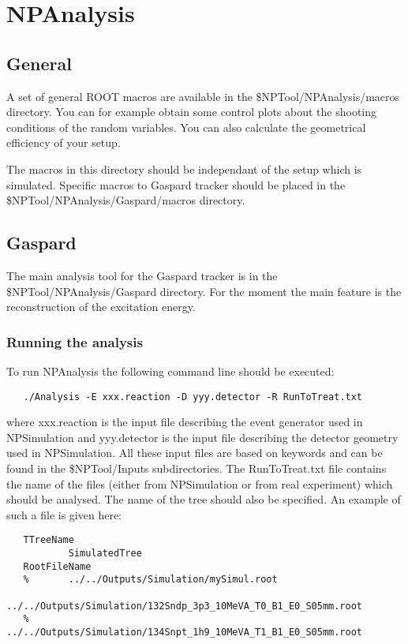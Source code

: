 \documentclass[a4paper,12pt]{article}
\begin{document}
\section{NPAnalysis}
\subsection{General}
A set of general ROOT macros are available in the \$NPTool/NPAnalysis/macros 
directory. You can for example obtain some control plots about the shooting
conditions of the random variables. You can also calculate the geometrical 
efficiency of your setup.

The macros in this directory should be independant of the setup which is simulated.
Specific macros to Gaspard tracker should be placed in the 
\$NPTool/NPAnalysis/Gaspard/macros directory.


\subsection{Gaspard}
The main analysis tool for the Gaspard tracker is in the \$NPTool/NPAnalysis/Gaspard
directory. For the moment the main feature is the reconstruction of the excitation 
energy.

\subsubsection{Running the analysis}
To run NPAnalysis the following command line should be executed:

\begin{verbatim}
   ./Analysis -E xxx.reaction -D yyy.detector -R RunToTreat.txt
\end{verbatim}

where xxx.reaction is the input file describing the event generator used in 
NPSimulation and yyy.detector is the input file describing the detector geometry
used in NPSimulation. All these input files are based on keywords and can be found 
in the \$NPTool/Inputs subdirectories. The RunToTreat.txt file contains the
name of the files (either from NPSimulation or from real experiment) which should
be analysed. The name of the tree should also be specified. An example 
of such a file is given here:

\begin{verbatim}
   TTreeName
           SimulatedTree
   RootFileName
   %       ../../Outputs/Simulation/mySimul.root
           ../../Outputs/Simulation/132Sndp_3p3_10MeVA_T0_B1_E0_S05mm.root
   %       ../../Outputs/Simulation/134Snpt_1h9_10MeVA_T1_B1_E0_S05mm.root
\end{verbatim}
\end{document}
